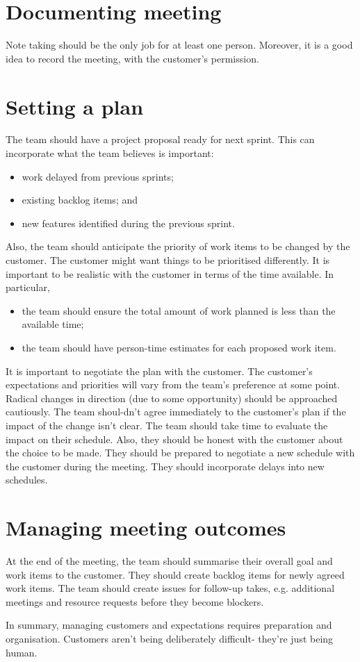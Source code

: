 \documentclass[a4paper, openany]{memoir}
\begin{document}
\section{Documenting meeting}
Note taking should be the only job for at least one person. Moreover, it is a good idea to record the meeting, with the customer's permission.

\section{Setting a plan}
The team should have a project proposal ready for next sprint. This can incorporate what the team believes is important:
\begin{itemize}
    \item work delayed from previous sprints;
    \item existing backlog items; and
    \item new features identified during the previous sprint.
\end{itemize}
Also, the team should anticipate the priority of work items to be changed by the customer. The customer might want things to be prioritised differently. It is important to be realistic with the customer in terms of the time available. In particular,
\begin{itemize}
    \item the team should ensure the total amount of work planned is less than the available time;
    \item the team should have person-time estimates for each proposed work item.
\end{itemize}

It is important to negotiate the plan with the customer. The customer's expectations and priorities will vary from the team's preference at some point. Radical changes in direction (due to some opportunity) should be approached cautiously. The team shoul-dn't agree immediately to the customer's plan if the impact of the change isn't clear. The team should take time to evaluate the impact on their schedule. Also, they should be honest with the customer about the choice to be made. They should be prepared to negotiate a new schedule with the customer during the meeting. They should incorporate delays into new schedules.

\section{Managing meeting outcomes}
At the end of the meeting, the team should summarise their overall goal and work items to the customer. They should create backlog items for newly agreed work items. The team should create issues for follow-up takes, e.g. additional meetings and resource requests before they become blockers.

In summary, managing customers and expectations requires preparation and organisation. Customers aren't being deliberately difficult- they're just being human.
\end{document}

